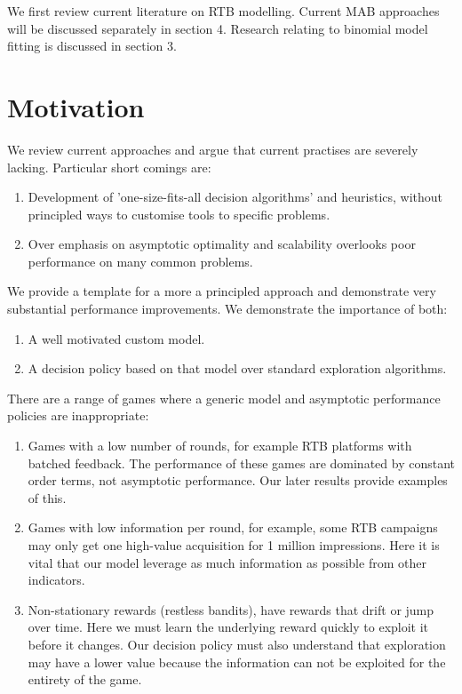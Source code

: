\documentclass[11pt,a4,singlespacing,titlepagenumber=on]{scrreprt}
\numberwithin{equation}{chapter} %
\theoremstyle{remark}
\begin{document}
We first review current literature on RTB modelling. Current MAB approaches will be discussed separately in section 4. Research relating to binomial model fitting is discussed in section 3.

\section{Motivation}

We review current approaches and argue that current practises are severely lacking. Particular short comings are:

\begin{enumerate}
	\item Development of 'one-size-fits-all decision algorithms' and heuristics, without principled ways to customise tools to specific problems.
	\item Over emphasis on asymptotic optimality and scalability overlooks poor performance on many common problems.
\end{enumerate}

We provide a template for a more a principled approach and demonstrate very substantial performance improvements. We demonstrate the importance of both:

\begin{enumerate}
	\item A well motivated custom model.
	\item A decision policy based on that model over standard exploration algorithms.
\end{enumerate}


There are a range of games where a generic model and asymptotic performance policies are inappropriate:

\begin{enumerate}
	\item Games with a low number of rounds, for example RTB platforms with batched feedback. The performance of these games are dominated by constant order terms, not asymptotic performance. Our later results provide examples of this. 
	\item Games with low information per round, for example, some RTB campaigns may only get one high-value acquisition for 1 million impressions. Here it is vital that our model leverage as much information as possible from other indicators.
	\item Non-stationary rewards (restless bandits), have rewards that drift or jump over time. Here we must learn the underlying reward quickly to exploit it before it changes. Our decision policy must also understand that exploration may have a lower value because the information can not be exploited for the entirety of the game.
\end{enumerate}
\end{document}
